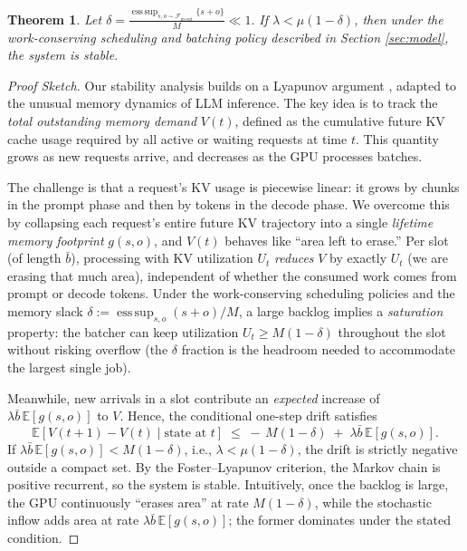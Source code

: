 \documentclass{article}
\DeclareMathOperator*{\esssup}{ess\,sup}
\newcommand{\E}{\mathbb{E}}
\theoremstyle{plain}
\newtheorem{theorem}{Theorem}[section]
\theoremstyle{definition}
\theoremstyle{remark}
\begin{document}
\begin{theorem} \label{thm:stable}
    Let $\delta =\frac{\esssup_{s,o\sim\mathcal{F}_{\text{in-out}}} \{ s+ o \}}{M}\ll 1. $ If $\lambda < \mu(1-\delta)$, then under the work-conserving scheduling and batching policy described in Section \ref{sec:model}, the system is stable.
\end{theorem}

\begin{proof}[Proof Sketch]
Our stability analysis builds on a Lyapunov argument \citep{bremaud2013markov}, adapted to the unusual memory dynamics of LLM inference. The key idea is to track the \emph{total outstanding memory demand} $V(t)$, defined as the cumulative future KV cache usage required by all active or waiting requests at time $t$. This quantity grows as new requests arrive, and decreases as the GPU processes batches.

The challenge is that a request’s KV usage is piecewise linear: it grows by chunks in the prompt phase and then by tokens in the decode phase. We overcome this by collapsing each request’s entire future KV trajectory into a single \emph{lifetime memory footprint} $g(s,o)$, and $V(t)$ behaves like “area left to erase.” Per slot (of length $\bar b$), processing with KV utilization $U_t$ \emph{reduces} $V$ by exactly $U_t$ (we are erasing that much area), independent of whether the consumed work comes from prompt or decode tokens. Under the work-conserving scheduling policies and the memory slack $\delta:=\esssup_{s,o}(s+o)/M$, a large backlog implies a \emph{saturation} property: the batcher can keep utilization $U_t\ge M(1-\delta)$ throughout the slot without risking overflow (the $\delta$ fraction is the headroom needed to accommodate the largest single job).

Meanwhile, new arrivals in a slot contribute an \emph{expected} increase of $\lambda \bar b\,\E[g(s,o)]$ to $V$. Hence, the conditional one-step drift satisfies
\[
\mathbb{E}[V(t{+}1)-V(t)\mid\text{state at }t]
\;\le\;
-\,M(1-\delta)\;+\;\lambda \bar b\,\E[g(s,o)].
\]
If $\lambda \bar b\,\E[g(s,o)]<M(1-\delta)$, i.e., $\lambda<\mu(1-\delta)$, the drift is strictly negative outside a compact set. By the Foster–Lyapunov criterion, the Markov chain is positive recurrent, so the system is stable. Intuitively, once the backlog is large, the GPU continuously “erases area” at rate $M(1-\delta)$, while the stochastic inflow adds area at rate $\lambda \bar b\,\E[g(s,o)]$; the former dominates under the stated condition.
\end{proof}
\end{document}

